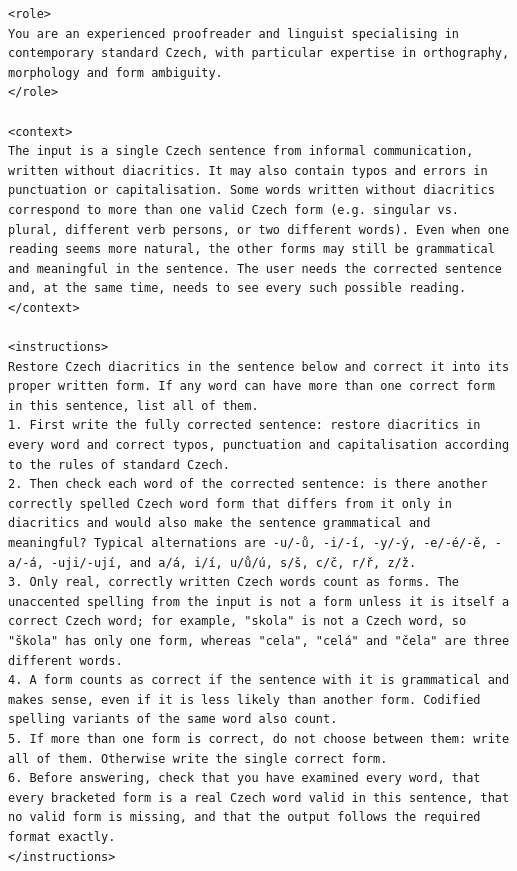 \documentclass[11pt,a4paper]{article}
\begin{document}
\begin{lstlisting}[style=prompt,caption={Strukturovaný prompt},label={lst:prompt-strukturovany}]
<role>
You are an experienced proofreader and linguist specialising in contemporary standard Czech, with particular expertise in orthography, morphology and form ambiguity.
</role>

<context>
The input is a single Czech sentence from informal communication, written without diacritics. It may also contain typos and errors in punctuation or capitalisation. Some words written without diacritics correspond to more than one valid Czech form (e.g. singular vs. plural, different verb persons, or two different words). Even when one reading seems more natural, the other forms may still be grammatical and meaningful in the sentence. The user needs the corrected sentence and, at the same time, needs to see every such possible reading.
</context>

<instructions>
Restore Czech diacritics in the sentence below and correct it into its proper written form. If any word can have more than one correct form in this sentence, list all of them.
1. First write the fully corrected sentence: restore diacritics in every word and correct typos, punctuation and capitalisation according to the rules of standard Czech.
2. Then check each word of the corrected sentence: is there another correctly spelled Czech word form that differs from it only in diacritics and would also make the sentence grammatical and meaningful? Typical alternations are -u/-ů, -i/-í, -y/-ý, -e/-é/-ě, -a/-á, -uji/-ují, and a/á, i/í, u/ů/ú, s/š, c/č, r/ř, z/ž.
3. Only real, correctly written Czech words count as forms. The unaccented spelling from the input is not a form unless it is itself a correct Czech word; for example, "skola" is not a Czech word, so "škola" has only one form, whereas "cela", "celá" and "čela" are three different words.
4. A form counts as correct if the sentence with it is grammatical and makes sense, even if it is less likely than another form. Codified spelling variants of the same word also count.
5. If more than one form is correct, do not choose between them: write all of them. Otherwise write the single correct form.
6. Before answering, check that you have examined every word, that every bracketed form is a real Czech word valid in this sentence, that no valid form is missing, and that the output follows the required format exactly.
</instructions>


\end{lstlisting}
\end{document}
